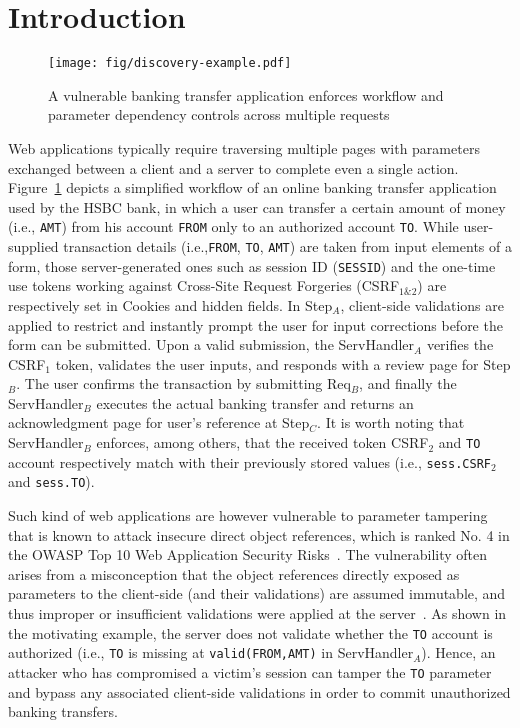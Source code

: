\documentclass[letter]{sig-alternate-2013}
\begin{document}
\section{Introduction}
\label{sec:crs_intro}

\begin{figure}[ht*]
\centering
\texttt{[image: fig/discovery-example.pdf]}
\caption{A vulnerable banking transfer application enforces workflow and parameter dependency controls across multiple requests}
\label{fig:runningexample}
\vspace{-1.5em}
\end{figure}

Web applications typically require traversing multiple pages with parameters exchanged between a client and a server to complete even a single action. 
Figure~\ref{fig:runningexample} depicts a simplified workflow of an online banking transfer application used by the HSBC bank, in which a user can transfer a certain amount of money (i.e., \verb"AMT") from his account \verb"FROM" only to an authorized account \verb"TO". While user-supplied transaction details (i.e.,\verb"FROM", \verb"TO", \verb"AMT") are taken from input elements of a form, those server-generated ones such as session ID (\verb"SESSID") and the one-time use tokens working against Cross-Site Request Forgeries (CSRF$_{1\&2}$) are respectively set in Cookies and hidden fields. In Step$_A$, client-side validations are applied to restrict and instantly prompt the user for input corrections before the form can be submitted. Upon a valid submission, the ServHandler$_A$ verifies the CSRF$_1$ token, validates the user inputs, and responds with a review page for Step$_B$. The user confirms the transaction by submitting Req$_B$, and finally the ServHandler$_B$ executes the actual banking transfer and returns an acknowledgment page for user's reference at Step$_C$. It is worth noting that ServHandler$_B$ enforces, among others, that the received token CSRF$_2$ and \verb"TO" account respectively match with their previously stored values (i.e., \verb"sess.CSRF"$_2$ and \verb"sess.TO").

Such kind of web applications are however vulnerable to parameter tampering that is known to attack insecure direct object references, which is ranked No. 4 in the OWASP Top 10 Web Application Security Risks~\cite{owasp-insecure-direct-object}. The vulnerability often arises from a misconception that the object references directly exposed as parameters to the client-side (and their validations) are assumed immutable, and thus improper or insufficient validations were applied at the server~\cite{immutable}. As shown in the motivating example, the server does not validate whether the \verb"TO" account is authorized (i.e., \verb"TO" is missing at \verb"valid(FROM,AMT)" in ServHandler$_A$). Hence, an attacker who has compromised a victim's session can tamper the \verb"TO" parameter and bypass any associated client-side validations in order to commit unauthorized banking transfers.
\end{document}
